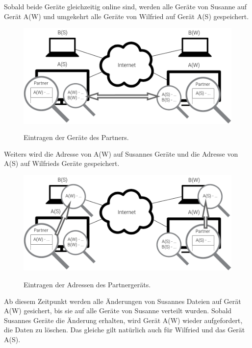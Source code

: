 Sobald beide Geräte gleichzeitig online sind, werden alle Geräte von Susanne auf Gerät A(W)
und umgekehrt alle Geräte von Wilfried auf Gerät A(S) gespeichert.
\begin{figure}[htb]
	\centering
  \includegraphics[]{images/partnerschaften_3.pdf}
	\label{partnerschaften_3}
  \caption{Eintragen der Geräte des Partners.}
\end{figure}
Weiters wird die Adresse von A(W) auf Susannes Geräte und die Adresse von A(S) auf Wilfrieds Geräte gespeichert.
\begin{figure}[htb]
	\centering
  \includegraphics[]{images/partnerschaften_4.pdf}
	\label{partnerschaften_4}
  \caption{Eintragen der Adressen des Partnergeräts.}
\end{figure}
Ab diesem Zeitpunkt werden alle Änderungen von Susannes Dateien auf Gerät A(W) gesichert,
bis sie auf alle Geräte von Susanne verteilt wurden. Sobald Susannes Geräte die Änderung
erhalten, wird Gerät A(W) wieder aufgefordert, die Daten zu löschen. Das gleiche gilt natürlich
auch für Wilfried und das Gerät A(S).
